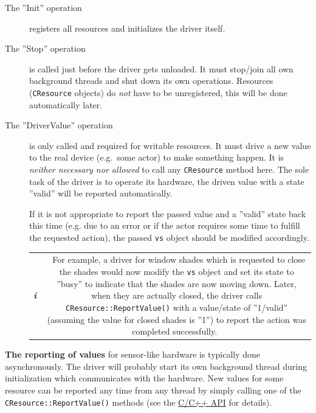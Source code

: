 \documentclass[12pt,english,parskip=half]{scrreprt}
\newcommand{\projecturl}{}
\newcommand{\infobox}[1]{
  \hfill
  \setlength\arrayrulewidth{1pt}
  \begin{tabular}[t]{c|c|}
    \parbox{1.8em}{\hfill\textit{\Huge\textbf{i}\,}}
    &
    \,\parbox{0.89\linewidth}{\setlength{\parskip}{0.5em}#1}\,
  \end{tabular}
  \par
}
\newcommand{\docref}[2]{\href{\projecturl#1}{#2}}
\newcommand{\refapic}{\docref{home2l-api_c/index.html}{C/C++ API}}
\begin{document}
\begin{description}

\item[The ''Init'' operation] 
  registers all resources and initializes the driver itself.

\item[The ''Stop'' operation]
  is called just before the driver gets unloaded. It must stop/join all own background 
  threads and shut down its own operations. 
  Resources (\texttt{CResource} objects) do \emph{not} have to be unregistered, 
  this will be done automatically later.
  
\item[The ''DriverValue'' operation]
  is only called and required for writable resources. It must drive a new value 
  to the real device (e.g.~some actor) to make something happen.
  It is \emph{neither necessary nor allowed} to call any \texttt{CResource} method here.
  The sole task of the driver is to operate its hardware, the driven value with 
  a state ''valid'' will be reported automatically.

  If it is not appropriate to report the passed value and a ''valid'' state back this
  time
  (e.g. due to an error or if the actor requires some time to fulfill the requested action),
  the passed \texttt{vs} object should be modified accordingly.
  
  \infobox{
    For example, a driver for window shades which is requested to close the shades
    would now modify the \texttt{vs} object and set its state to ''busy'' to indicate 
    that the shades are now moving down.
    Later, when they are actually closed, the driver calls \texttt{CResource::ReportValue()}
    with a value/state of ''1/valid'' (assuming the value for closed shades is ''1'')
    to report the action was completed successfully.
  }
  
\end{description}

\textbf{The reporting of values} for sensor-like hardware is typically done
asynchronously. The driver will probably start its own background thread during
initialization which communicates with the hardware. New values for some
resource can be reported any time from any thread by simply calling one
of the \texttt{CResource::ReportValue()} methods (see the \refapic{} for details).





\end{document}
